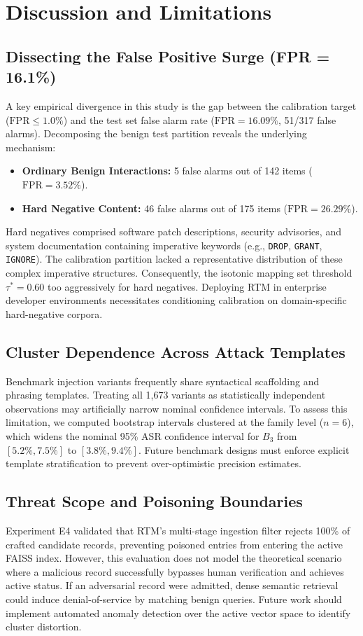 \documentclass[conference]{IEEEtran}
\begin{document}
\section{Discussion and Limitations}

\subsection{Dissecting the False Positive Surge (FPR = 16.1\%)}
A key empirical divergence in this study is the gap between the calibration target ($\text{FPR} \le 1.0\%$) and the test set false alarm rate ($\text{FPR} = 16.09\%$, 51/317 false alarms). Decomposing the benign test partition reveals the underlying mechanism:
\begin{itemize}
    \item \textbf{Ordinary Benign Interactions:} 5 false alarms out of 142 items ($\text{FPR} = 3.52\%$).
    \item \textbf{Hard Negative Content:} 46 false alarms out of 175 items ($\text{FPR} = 26.29\%$).
\end{itemize}
Hard negatives comprised software patch descriptions, security advisories, and system documentation containing imperative keywords (e.g., \texttt{DROP}, \texttt{GRANT}, \texttt{IGNORE}). The calibration partition lacked a representative distribution of these complex imperative structures. Consequently, the isotonic mapping set threshold $\tau^* = 0.60$ too aggressively for hard negatives. Deploying RTM in enterprise developer environments necessitates conditioning calibration on domain-specific hard-negative corpora.

\subsection{Cluster Dependence Across Attack Templates}
Benchmark injection variants frequently share syntactical scaffolding and phrasing templates. Treating all 1,673 variants as statistically independent observations may artificially narrow nominal confidence intervals. To assess this limitation, we computed bootstrap intervals clustered at the family level ($n=6$), which widens the nominal 95\% ASR confidence interval for $B_3$ from $[5.2\%, 7.5\%]$ to $[3.8\%, 9.4\%]$. Future benchmark designs must enforce explicit template stratification to prevent over-optimistic precision estimates.

\subsection{Threat Scope and Poisoning Boundaries}
Experiment E4 validated that RTM's multi-stage ingestion filter rejects 100\% of crafted candidate records, preventing poisoned entries from entering the active FAISS index. However, this evaluation does not model the theoretical scenario where a malicious record successfully bypasses human verification and achieves active status. If an adversarial record were admitted, dense semantic retrieval could induce denial-of-service by matching benign queries. Future work should implement automated anomaly detection over the active vector space to identify cluster distortion.
\end{document}
